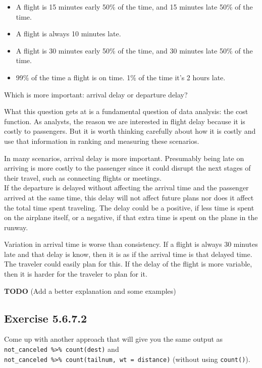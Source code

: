 \documentclass[]{book}
\providecommand{\tightlist}{%
  \setlength{\itemsep}{0pt}\setlength{\parskip}{0pt}}
\theoremstyle{plain}
\theoremstyle{remark}
\begin{document}
\begin{itemize}
\tightlist
\item
  A flight is 15 minutes early 50\% of the time, and 15 minutes late 50\% of the time.
\item
  A flight is always 10 minutes late.
\item
  A flight is 30 minutes early 50\% of the time, and 30 minutes late 50\% of the time.
\item
  99\% of the time a flight is on time. 1\% of the time it's 2 hours late.
\end{itemize}

Which is more important: arrival delay or departure delay?

What this question gets at is a fundamental question of data analysis: the cost function.
As analysts, the reason we are interested in flight delay because it is costly to passengers.
But it is worth thinking carefully about how it is costly and use that information in ranking and measuring these scenarios.

In many scenarios, arrival delay is more important.
Presumably being late on arriving is more costly to the passenger since it could disrupt the next stages of their travel, such as connecting flights or meetings.\\
If the departure is delayed without affecting the arrival time and the passenger arrived at the same time, this delay will not affect future plans nor does it affect the total time spent traveling.
The delay could be a positive, if less time is spent on the airplane itself, or a negative, if that extra time is spent on the plane in the runway.

Variation in arrival time is worse than consistency.
If a flight is always 30 minutes late and that delay is know, then it is as if the arrival time is that delayed time.
The traveler could easily plan for this. If the delay of the flight is more variable, then it is harder for the traveler to plan for it.

\textbf{TODO} (Add a better explanation and some examples)

\hypertarget{exercise-5.6.7.2}{%
\subsection*{\texorpdfstring{Exercise {5.6.7.2}}{Exercise 5.6.7.2}}\label{exercise-5.6.7.2}}

Come up with another approach that will give you the same output as \texttt{not\_canceled\ \%\textgreater{}\%\ count(dest)} and \texttt{not\_canceled\ \%\textgreater{}\%\ count(tailnum,\ wt\ =\ distance)} (without using \texttt{count()}).
\end{document}
